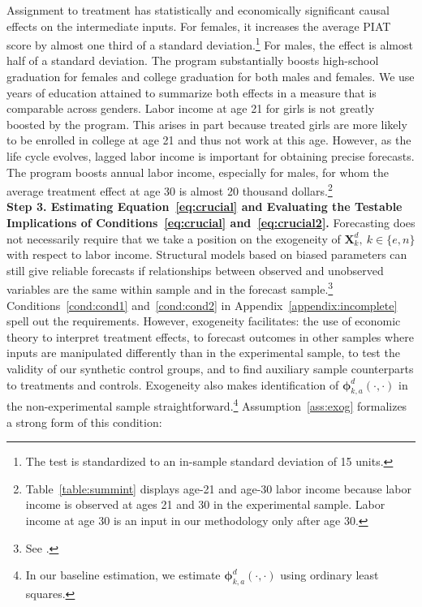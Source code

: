Assignment to treatment has statistically and economically significant causal effects on the intermediate inputs. For females, it increases the average PIAT score by almost one third of a standard deviation.\footnote{The test is standardized to an in-sample standard deviation of 15 units.} For males, the effect is almost half of a standard deviation. The program substantially boosts high-school graduation for females and college graduation for both males and females. We use years of education attained to summarize both effects in a measure that is comparable across genders. Labor income at age 21 for girls is not greatly boosted by the program. This arises in part because treated girls are more likely to be enrolled in college at age 21 and thus not work at this age. However, as the life cycle evolves, lagged labor income is important for obtaining precise forecasts. The program boosts annual labor income, especially for males, for whom the average treatment effect at age 30 is almost 20 thousand dollars.\footnote{Table~\ref{table:summint} displays age-21 and age-30 labor income because labor income is observed at ages 21 and 30 in the experimental sample. Labor income at age 30 is an input in our methodology only after age 30.}\\

\textbf{Step 3. Estimating Equation~\eqref{eq:crucial} and Evaluating the Testable Implications of Conditions~\eqref{eq:crucial} and~\eqref{eq:crucial2}.} Forecasting does not necessarily require that we take a position on the exogeneity of $\bm{X}^d_k, \: k \in \{e,n\}$ with respect to labor income. Structural models based on biased parameters can still give reliable forecasts if relationships between observed and unobserved variables are the same within sample and in the forecast sample.\footnote{See \cite{Liu-etal-2016-USC-Data-Models}.} Conditions~\ref{cond:cond1} and~\ref{cond:cond2} in Appendix~\ref{appendix:incomplete} spell out the requirements. However, exogeneity facilitates: the use of economic theory to interpret treatment effects, to forecast outcomes in other samples where inputs are manipulated differently than in the experimental sample, to test the validity of our synthetic control groups, and to find auxiliary sample counterparts to treatments and controls. Exogeneity also makes identification of $\bm{\phi}^d_{k,a}\left( \cdot, \cdot \right)$ in the non-experimental sample straightforward.\footnote{In our baseline estimation, we estimate $\bm{\phi}^d_{k,a}\left( \cdot, \cdot \right)$ using ordinary least squares.} Assumption~\ref{ass:exog} formalizes a strong form of this condition:

